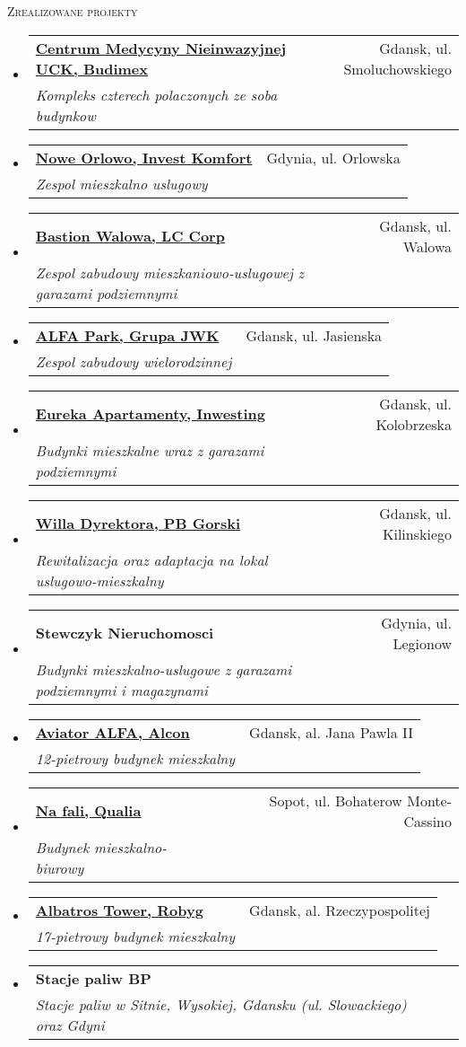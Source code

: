 \documentclass[letterpaper,11pt]{article}
\makeatletter
\newcommand{\resheading}[1]{
  \begin{tcolorbox}
  \textsc{#1}
  \end{tcolorbox}
}
\newcommand{\ressubheading}[4]{
\begin{tabular*}{6.5in}{l@{\extracolsep{\fill}}r}
		\textbf{#1} & #2 \\
		\textit{#3} & \textit{#4} \\
\end{tabular*}\vspace{-6pt}}
\makeatother
\begin{document}
\resheading{Zrealizowane projekty}
\begin{itemize}

\item
  \ressubheading{\href{https://www.urbanity.pl/pomorskie/gdansk/centrum-medycyny-nieinwazyjnej,b4155}{Centrum Medycyny Nieinwazyjnej UCK, Budimex}}{Gdansk, ul. Smoluchowskiego}{Kompleks czterech polaczonych ze soba budynkow}{}

\item
  \ressubheading{\href{https://www.investkomfort.pl/mieszkania-gdynia/nowe-orlowo/}{Nowe Orlowo, Invest Komfort}}{Gdynia, ul. Orlowska}{Zespol mieszkalno uslugowy}{} 
  
\item
  \ressubheading{\href{https://www.ndi.pl/en/bastion-walowa}{Bastion Walowa, LC Corp}}{Gdansk, ul. Walowa}{Zespol zabudowy mieszkaniowo-uslugowej z garazami podziemnymi}{}

\item
  \ressubheading{\href{https://alfapark.pl}{ALFA Park, Grupa JWK}}{Gdansk, ul. Jasienska}{Zespol zabudowy wielorodzinnej}{}

\item
  \ressubheading{\href{http://eurekaapartamenty.pl/}{Eureka Apartamenty, Inwesting}}{Gdansk, ul. Kolobrzeska}{Budynki mieszkalne wraz z garazami podziemnymi}{}

\item
  \ressubheading{\href{http://www.browargdanski.pl}{Willa Dyrektora, PB Gorski}}{Gdansk, ul. Kilinskiego}{Rewitalizacja oraz adaptacja na lokal uslugowo-mieszkalny}{}

\item
  \ressubheading{Stewczyk Nieruchomosci}{Gdynia, ul. Legionow}{Budynki mieszkalno-uslugowe z garazami podziemnymi i magazynami}{}
  
\item
  \ressubheading{\href{https://www.allcon.pl/mieszkania/apartamenty/awiator}{Aviator ALFA, Alcon}}{Gdansk, al. Jana Pawla II}{12-pietrowy budynek mieszkalny}{}

\item
  \ressubheading{\href{https://dom.trojmiasto.pl/Na-Fali-i310.html}{Na fali, Qualia}}{Sopot, ul. Bohaterow Monte-Cassino}{Budynek mieszkalno-biurowy}{}

\item
  \ressubheading{\href{https://www.gdansk.robyg.pl/oferta/mieszkania/albatross-towers}{Albatros Tower, Robyg}}{Gdansk, al. Rzeczypospolitej}{17-pietrowy budynek mieszkalny}{}

\item
  \ressubheading{Stacje paliw BP}{}{Stacje paliw w Sitnie, Wysokiej, Gdansku (ul. Slowackiego) oraz Gdyni}{}

\end{itemize}
\end{document}
